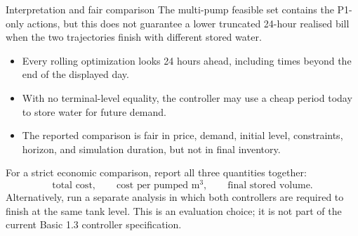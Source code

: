 \documentclass[t,12pt]{beamer}
\begin{document}
\begin{frame}{Interpretation and fair comparison}
The multi-pump feasible set contains the P1-only actions, but this does not
guarantee a lower truncated 24-hour realised bill when the two trajectories
finish with different stored water.

\begin{itemize}
  \item Every rolling optimization looks 24 hours ahead, including times
        beyond the end of the displayed day.
  \item With no terminal-level equality, the controller may use a cheap
        period today to store water for future demand.
  \item The reported comparison is fair in price, demand, initial level,
        constraints, horizon, and simulation duration, but not in final
        inventory.
\end{itemize}

For a strict economic comparison, report all three quantities together:
\[
  \boxed{\text{total cost}},\qquad
  \boxed{\text{cost per pumped }\mathrm{m^3}},\qquad
  \boxed{\text{final stored volume}}.
\]
Alternatively, run a separate analysis in which both controllers are
required to finish at the same tank level.  This is an evaluation choice;
it is not part of the current Basic 1.3 controller specification.
\end{frame}
\end{document}
